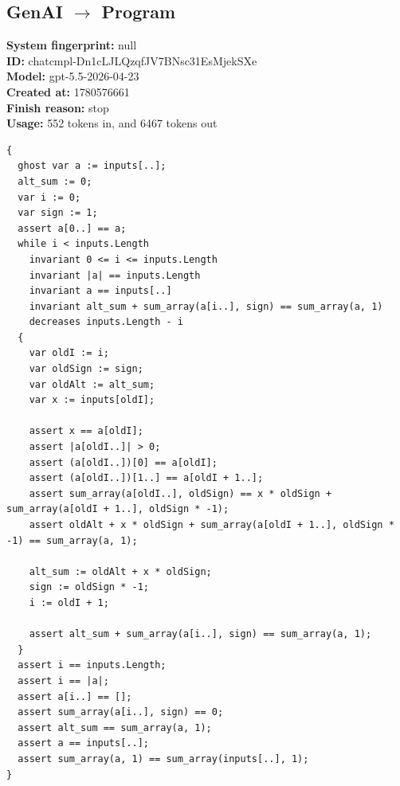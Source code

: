\documentclass{article}
\begin{document}
\subsection*{GenAI $\rightarrow$ Program}
\textbf{System fingerprint: }null
\\\textbf{ID: }chatcmpl-Dn1cLJLQzqfJV7BNsc31EsMjekSXe
\\\textbf{Model: }gpt-5.5-2026-04-23
\\\textbf{Created at: }1780576661
\\\textbf{Finish reason: }stop
\\\textbf{Usage: }552 tokens in, and 6467 tokens out
\begin{lstlisting}
{
  ghost var a := inputs[..];
  alt_sum := 0;
  var i := 0;
  var sign := 1;
  assert a[0..] == a;
  while i < inputs.Length
    invariant 0 <= i <= inputs.Length
    invariant |a| == inputs.Length
    invariant a == inputs[..]
    invariant alt_sum + sum_array(a[i..], sign) == sum_array(a, 1)
    decreases inputs.Length - i
  {
    var oldI := i;
    var oldSign := sign;
    var oldAlt := alt_sum;
    var x := inputs[oldI];

    assert x == a[oldI];
    assert |a[oldI..]| > 0;
    assert (a[oldI..])[0] == a[oldI];
    assert (a[oldI..])[1..] == a[oldI + 1..];
    assert sum_array(a[oldI..], oldSign) == x * oldSign + sum_array(a[oldI + 1..], oldSign * -1);
    assert oldAlt + x * oldSign + sum_array(a[oldI + 1..], oldSign * -1) == sum_array(a, 1);

    alt_sum := oldAlt + x * oldSign;
    sign := oldSign * -1;
    i := oldI + 1;

    assert alt_sum + sum_array(a[i..], sign) == sum_array(a, 1);
  }
  assert i == inputs.Length;
  assert i == |a|;
  assert a[i..] == [];
  assert sum_array(a[i..], sign) == 0;
  assert alt_sum == sum_array(a, 1);
  assert a == inputs[..];
  assert sum_array(a, 1) == sum_array(inputs[..], 1);
}
\end{lstlisting}
\end{document}

